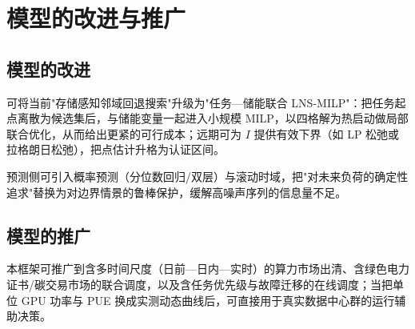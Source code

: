 \section{模型的改进与推广}

\subsection{模型的改进}
可将当前"存储感知邻域回退搜索"升级为"任务—储能联合 LNS-MILP"：把任务起点离散为候选集后，与储能变量一起进入小规模 MILP，以四格解为热启动做局部联合优化，从而给出更紧的可行成本；远期可为 $I$ 提供有效下界（如 LP 松弛或拉格朗日松弛），把点估计升格为认证区间。

预测侧可引入概率预测（分位数回归/双层）与滚动时域，把"对未来负荷的确定性追求"替换为对边界情景的鲁棒保护，缓解高噪声序列的信息量不足。

\subsection{模型的推广}
本框架可推广到含多时间尺度（日前—日内—实时）的算力市场出清、含绿色电力证书/碳交易市场的联合调度，以及含任务优先级与故障迁移的在线调度；当把单位 GPU 功率与 PUE 换成实测动态曲线后，可直接用于真实数据中心群的运行辅助决策。

